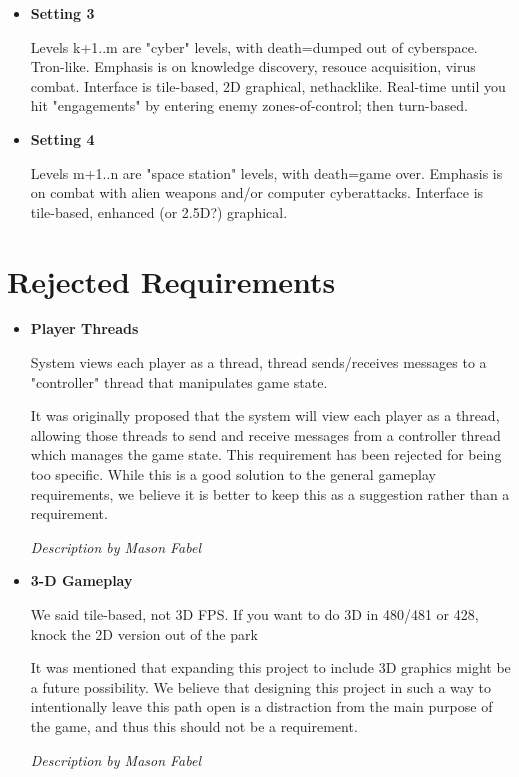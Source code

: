 \documentclass[12pt]{article}
\begin{document}
\begin{itemize}
	\item \textbf{Setting 3}
	
	Levels k+1..m are "cyber" levels, with death=dumped out of cyberspace.
	Tron-like. Emphasis is on knowledge discovery, resouce acquisition,
	virus combat. Interface is tile-based, 2D graphical, nethacklike.
	Real-time until you hit "engagements" by entering enemy
	zones-of-control; then turn-based.
	
	\item \textbf{Setting 4}
	
	Levels m+1..n are "space station" levels, with death=game over.
	Emphasis is on combat with alien weapons and/or computer cyberattacks.
	Interface is tile-based, enhanced (or 2.5D?) graphical. 
\end{itemize}

\section{Rejected Requirements}
\begin{itemize}
	\item \textbf{Player Threads}
	
	System views each player as a thread, thread sends/receives messages
	to a "controller" thread that manipulates game state.
	
	It was originally proposed that the system will view each player as a
	thread, allowing those threads to send and receive messages from a
	controller thread which manages the game state. This requirement has been
	rejected for being too specific. While this is a good solution to the
	general gameplay requirements, we believe it is better to keep this as a
	suggestion rather than a requirement.
	
	\emph{Description by Mason Fabel}
		
	\item \textbf{3-D Gameplay}
	
	We said tile-based, not 3D FPS. If you want to do 3D in 480/481 or
	428, knock the 2D version out of the park 
	
	It was mentioned that expanding this project to include 3D graphics might
	be a future possibility. We believe that designing this project in such a
	way to intentionally leave this path open is a distraction from the main
	purpose of the game, and thus this should not be a requirement.
	
	\emph{Description by Mason Fabel}
	
\end{itemize}
\end{document}
